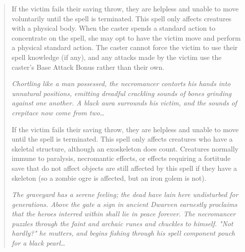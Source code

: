 \begin{quote}
If the victim fails their saving throw, they are helpless and unable to move voluntarily until the spell is terminated. This spell only affects creatures with a physical body. When the caster spends a standard action to concentrate on the spell, she may opt to have the victim move and perform a physical standard action. The caster cannot force the victim to use their spell knowledge (if any), and any attacks made by the victim use the caster's Base Attack Bonus rather than their own.\\

\begin{small}
\end{small}
\emph{Chortling like a man possessed, the necromancer contorts his hands into unnatural positions, emitting dreadful crackling sounds of bones grinding against one another. A black aura surrounds his victim, and the sounds of crepitace now come from two\ldots}

If the victim fails their saving throw, they are helpless and unable to move until the spell is terminated. This spell only affects creatures who have a skeletal structure, although an exoskeleton does count. Creatures normally immune to paralysis, necromantic effects, or effects requiring a fortitude save that do not affect objects are still affected by this spell if they have a skeleton (so a zombie ogre is affected, but an iron golem is not).\\

\begin{small}
\end{small}
\emph{The graveyard has a serene feeling; the dead have lain here undisturbed for generations. Above the gate a sign in ancient Dwarven earnestly proclaims that the heroes interred within shall lie in peace forever. The necromancer puzzles through the faint and archaic runes and chuckles to himself. "Not hardly?" he mutters, and begins fishing through his spell component pouch for a black pearl\ldots}


\end{quote}
